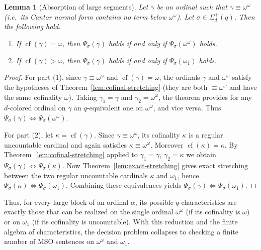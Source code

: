 \documentclass{amsart}
\newcommand{\cf}{\operatorname{cf}}
\newtheorem{lemma}{Lemma}
\theoremstyle{definition}
\begin{document}
\begin{lemma}[Absorption of large segments]\label{lem:absorb-large}
    Let $\gamma$ be an ordinal such that $\gamma\equiv\omega^\omega$ (i.e.\ its Cantor normal form contains no term below $\omega^\omega$). Let $\sigma\in\Sigma_d^+(q)$. Then the following hold.
    \begin{enumerate}
        \item If $\cf(\gamma)=\omega$, then $\Psi_\sigma(\gamma)$ holds if and only if $\Psi_\sigma(\omega^\omega)$ holds.
        \item If $\cf(\gamma)>\omega$, then $\Psi_\sigma(\gamma)$ holds if and only if $\Psi_\sigma(\omega_1)$ holds.
    \end{enumerate}
\end{lemma}
\begin{proof}
    For part (1), since $\gamma\equiv\omega^\omega$ and $\cf(\gamma)=\omega$, the ordinals $\gamma$ and $\omega^\omega$ satisfy the hypotheses of Theorem~\ref{lem:cofinal-stretching} (they are both $\equiv\omega^\omega$ and have the same cofinality $\omega$).  Taking $\gamma_1=\gamma$ and $\gamma_2=\omega^\omega$, the theorem provides for any $d$-colored ordinal on $\gamma$ an $q$-equivalent one on $\omega^\omega$, and vice versa.  Thus $\Psi_\sigma(\gamma)\iff\Psi_\sigma(\omega^\omega)$.

    For part (2), let $\kappa=\cf(\gamma)$.  Since $\gamma\equiv\omega^\omega$, its cofinality $\kappa$ is a regular uncountable cardinal and again satisfies $\kappa\equiv\omega^\omega$.  Moreover $\cf(\kappa)=\kappa$.  By Theorem~\ref{lem:cofinal-stretching} applied to $\gamma_1=\gamma$, $\gamma_2=\kappa$ we obtain $\Psi_\sigma(\gamma)\iff\Psi_\sigma(\kappa)$.  Now Theorem~\ref{lem:exact-stretching} gives exact stretching between the two regular uncountable cardinals $\kappa$ and $\omega_1$, hence $\Psi_\sigma(\kappa)\iff\Psi_\sigma(\omega_1)$.  Combining these equivalences yields $\Psi_\sigma(\gamma)\iff\Psi_\sigma(\omega_1)$.
\end{proof}

Thus, for every large block of an ordinal $\alpha$, its possible $q$-characteristics are exactly those that can be realized on the single ordinal $\omega^\omega$ (if its cofinality is $\omega$) or on $\omega_1$ (if its cofinality is uncountable).  With this reduction and the finite algebra of characteristics, the decision problem collapses to checking a finite number of MSO sentences on $\omega^\omega$ and $\omega_1$.
\end{document}
